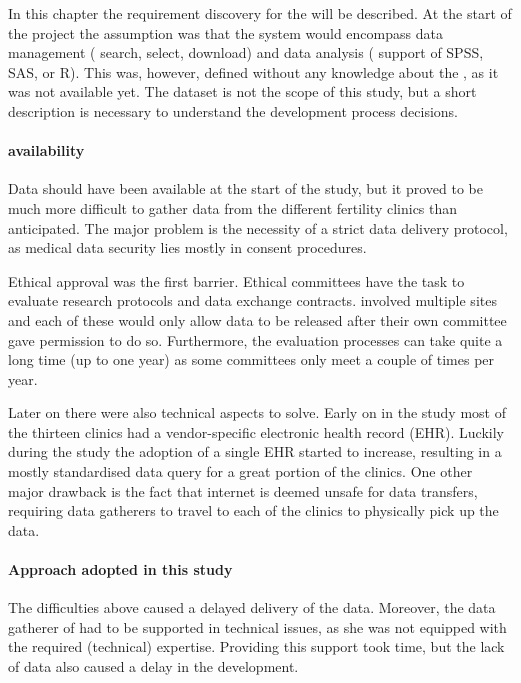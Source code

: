 In this chapter the requirement discovery for the \ivfsystem{} will be described.
At the start of the project the assumption was that the system would encompass data management (\eg{} search, select, download) and data analysis (\eg{} support of SPSS, SAS, or R).
This was, however, defined without any knowledge about the \projectdata{}, as it was not available yet.
The dataset is not the scope of this study, but a short description is necessary to understand the development process decisions.

\paragraph{\projectdata{} availability}
Data should have been available at the start of the study, but it proved to be much more difficult to gather data from the different fertility clinics than anticipated.
The major problem is the necessity of a strict data delivery protocol, as medical data security lies mostly in consent procedures.

Ethical approval was the first barrier.
Ethical committees have the task to evaluate research protocols and data exchange contracts.
\project{} involved multiple sites and each of these would only allow data to be released after their own committee gave permission to do so.
Furthermore, the evaluation processes can take quite a long time (up to one year) as some committees only meet a couple of times per year.

Later on there were also technical aspects to solve.
Early on in the study most of the thirteen clinics had a vendor-specific electronic health record (EHR).
Luckily during the study the adoption of a single EHR started to increase, resulting in a mostly standardised data query for a great portion of the clinics.
One other major drawback is the fact that internet is deemed unsafe for data transfers, requiring data gatherers to travel to each of the clinics to physically pick up the data.

\paragraph{Approach adopted in this study}
The difficulties above caused a delayed delivery of the data.
Moreover, the data gatherer of \project{} had to be supported in technical issues, as she was not equipped with the required (technical) expertise. 
Providing this support took time, but the lack of data also caused a delay in the \ivfsystem{} development.

